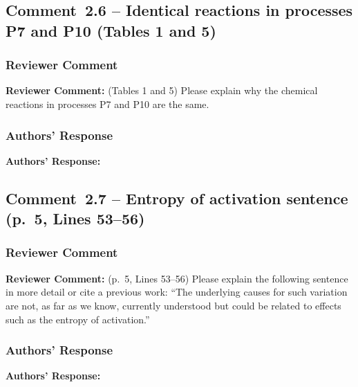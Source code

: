 \documentclass[12pt]{article}
\newcommand{\reviewlabel}{\textbf{\textcolor{commentframe}{Reviewer Comment:}}}
\newcommand{\responselabel}{\textbf{\textcolor{responseframe}{Authors' Response:}}}
\begin{document}
\subsection{Comment~2.6 -- Identical reactions in processes P7 and P10 (Tables 1 and 5)}

\subsubsection{Reviewer Comment}
\begin{reviewerbox}
\reviewlabel{} (Tables 1 and 5) Please explain why the chemical reactions in
processes P7 and P10 are the same.
\end{reviewerbox}

\subsubsection{Authors' Response}
\begin{responsebox}
\responselabel{}

\end{responsebox}

\subsection{Comment~2.7 -- Entropy of activation sentence (p.~5, Lines 53--56)}

\subsubsection{Reviewer Comment}
\begin{reviewerbox}
\reviewlabel{} (p.~5, Lines 53--56) Please explain the following sentence in
more detail or cite a previous work: ``The underlying causes for such
variation are not, as far as we know, currently understood but could be
related to effects such as the entropy of activation.''
\end{reviewerbox}

\subsubsection{Authors' Response}
\begin{responsebox}
\responselabel{}

\end{responsebox}
\end{document}

